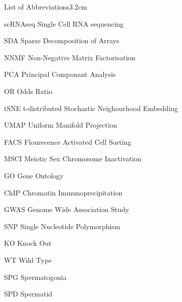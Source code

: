 \begin{mclistof}{List of Abbreviations}{3.2cm}

\item[scRNAseq] Single Cell RNA sequencing

\item[SDA] Sparse Decomposition of Arrays

\item[NNMF] Non-Negative Matrix Factorisation

\item[PCA] Principal Componant Analysis

\item[OR] Odds Ratio

\item[tSNE] t-distributed Stochastic Neighourhood Embedding

\item[UMAP] Uniform Manifold Projection

\item[FACS] Flourecence Activated Cell Sorting

\item[MSCI] Meiotic Sex Chromosome Inactivation

\item[GO] Gene Ontology

\item[ChIP] Chromatin Immunoprecipitation

\item[GWAS] Genome Wide Association Study

\item[SNP] Single Nucleotide Polymorphism

\item[KO] Knock Out

\item[WT] Wild Type

\item[SPG] Spermatogonia

\item[SPD] Spermatid

\end{mclistof} 
